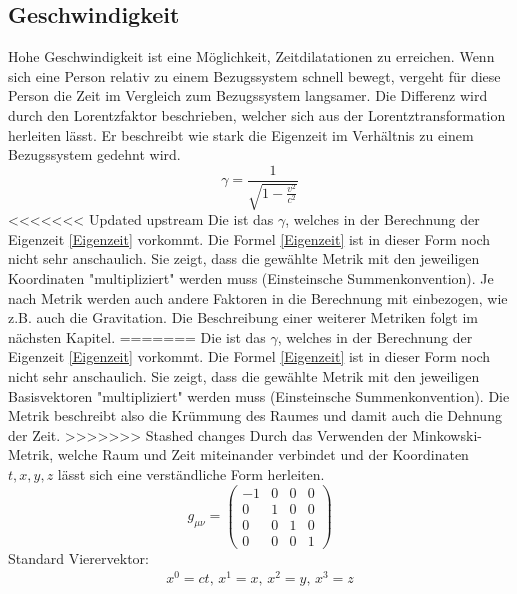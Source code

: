 \begin{refsection}
\subsection{Geschwindigkeit}
Hohe Geschwindigkeit ist eine Möglichkeit, Zeitdilatationen zu erreichen. Wenn sich eine Person relativ zu einem Bezugssystem schnell bewegt, vergeht f\"ur diese Person die Zeit im Vergleich zum Bezugssystem langsamer. Die Differenz wird durch den Lorentzfaktor beschrieben, welcher sich aus der Lorentztransformation herleiten l\"asst. Er beschreibt wie stark die Eigenzeit im Verhältnis zu einem Bezugssystem gedehnt wird. 
\begin{equation} \label{lorentzfaktor}
    \gamma=\frac{1}{\sqrt{1-\displaystyle\frac{v^2}{c^2}}} 
\end{equation}
<<<<<<< Updated upstream
Die ist das $\gamma$, welches in der Berechnung der Eigenzeit \eqref{Eigenzeit} vorkommt. %
Die Formel \eqref{Eigenzeit} ist in dieser Form noch nicht sehr anschaulich. Sie zeigt, dass die gewählte Metrik mit den jeweiligen Koordinaten "multipliziert" werden muss (Einsteinsche Summenkonvention). Je nach Metrik werden auch andere Faktoren in die Berechnung mit einbezogen, wie z.B. auch die Gravitation. Die Beschreibung einer weiterer Metriken folgt im nächsten Kapitel.
=======
Die ist das $\gamma$, welches in der Berechnung der Eigenzeit \eqref{Eigenzeit} vorkommt.
Die Formel \eqref{Eigenzeit} ist in dieser Form noch nicht sehr anschaulich. Sie zeigt, dass die gewählte Metrik mit den jeweiligen Basisvektoren "multipliziert" werden muss (Einsteinsche Summenkonvention). Die Metrik beschreibt also die Krümmung des Raumes und damit auch die Dehnung der Zeit. %
>>>>>>> Stashed changes
Durch das Verwenden der Minkowski-Metrik, welche Raum und Zeit miteinander verbindet und der Koordinaten $t, x, y, z$ l\"asst sich eine verst\"andliche Form herleiten. 
\begin{equation}
    g_{\mu\nu}=
    \begin{pmatrix}
        -1 & 0 & 0 & 0 \\
        0 & 1 & 0 & 0 \\
        0 & 0 & 1 & 0 \\
        0 & 0 & 0 & 1
    \end{pmatrix}
\end{equation}
Standard Vierervektor:
\begin{align*}
x^{0}=ct,\, x^{1}=x,\, x^{2}=y,\, x^{3}=z 
\end{align*}

\end{refsection}
